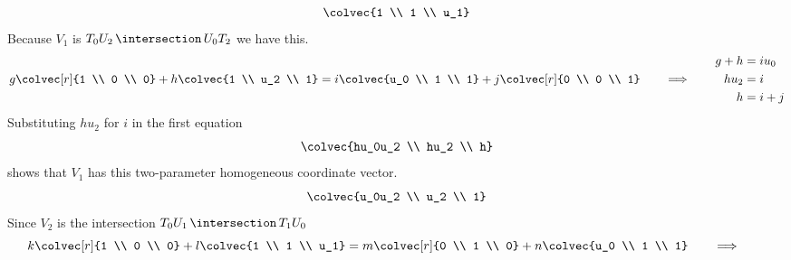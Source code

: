 \begin{exercises}
\begin{answer}
\begin{exparts}
          \begin{equation*}
            \colvec{1 \\ 1 \\ u_1}
          \end{equation*}
        \partsitem
          Because $V_1$ is $T_0U_2\,\intersection\,U_0T_2$ we have this.
          \begin{equation*}
            g\colvec[r]{1 \\ 0 \\ 0}+h\colvec{1 \\ u_2 \\ 1}
            =i\colvec{u_0 \\ 1 \\ 1}+j\colvec[r]{0 \\ 0 \\ 1}
            \qquad\Longrightarrow\qquad
            \begin{aligned}
              g+h  &= iu_0 \\
              hu_2 &= i    \\
              h    &= i+j
            \end{aligned}
          \end{equation*}
          Substituting $hu_2$ for $i$ in the first equation 
          \begin{equation*}
            \colvec{hu_0u_2 \\ hu_2 \\ h}
          \end{equation*}
          shows that $V_1$ has this 
          two-parameter homogeneous coordinate vector.
          \begin{equation*}
            \colvec{u_0u_2 \\ u_2 \\ 1}
          \end{equation*}
        \partsitem
           Since $V_2$ is the intersection 
           $T_0U_1\,\intersection\,T_1U_0$ 
           \begin{equation*}
             k\colvec[r]{1 \\ 0 \\ 0}+l\colvec{1 \\ 1 \\ u_1}
              =m\colvec[r]{0 \\ 1 \\ 0}+n\colvec{u_0 \\ 1 \\ 1}
            \qquad\Longrightarrow\qquad
            \begin{aligned}

\end{aligned}
\end{equation*}
\end{exparts}
\end{answer}
\end{exercises}
